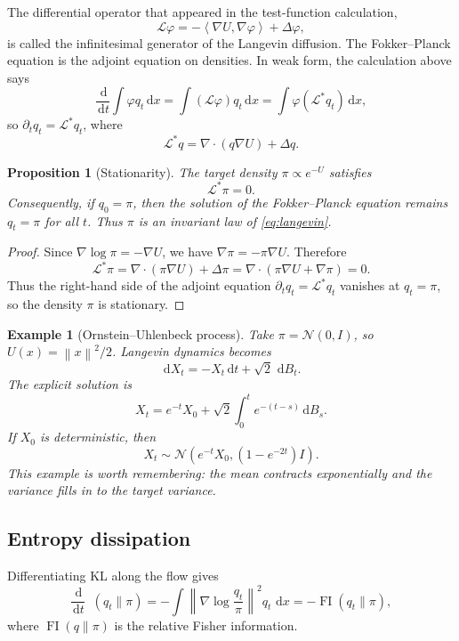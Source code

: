 \documentclass[10pt,a4paper]{amsart}
\numberwithin{equation}{section}
\newtheorem{prop}[theorem]{Proposition}
\newtheorem*{example}{Example}
\DeclareMathOperator{\KL}{D_{\mathsf{KL}}}
\DeclareMathOperator{\FI}{FI}
\newcommand{\dd}{\,\mathrm{d}}
\newcommand{\Id}{I}
\newcommand{\norm}[1]{\left\lVert #1 \right\rVert}
\newcommand{\ip}[2]{\left\langle #1,#2 \right\rangle}
\newcommand{\normal}[2]{\mathcal{N}\!\left(#1,#2\right)}
\begin{document}
The differential operator that appeared in the test-function calculation,
\[
    \mathcal L\varphi
    =
    -\ip{\nabla U}{\nabla\varphi}+\Delta\varphi,
\]
is called the infinitesimal generator of the Langevin diffusion.  The
Fokker--Planck equation is the adjoint equation on densities.  In weak form,
the calculation above says
\[
    \frac{\dd}{\dd t}\int \varphi q_t\dd x
    =
    \int (\mathcal L\varphi) q_t\dd x
    =
    \int \varphi(\mathcal L^\ast q_t)\dd x,
\]
so $\partial_t q_t=\mathcal L^\ast q_t$, where
\[
    \mathcal L^\ast q
    =
    \nabla\cdot(q\nabla U)+\Delta q.
\]

\begin{prop}[Stationarity]
The target density $\pi\propto e^{-U}$ satisfies
\[
    \mathcal L^\ast \pi=0.
\]
Consequently, if $q_0=\pi$, then the solution of the Fokker--Planck equation
remains $q_t=\pi$ for all $t$.  Thus $\pi$ is an invariant law of
\eqref{eq:langevin}.
\end{prop}

\begin{proof}
Since $\nabla\log\pi=-\nabla U$, we have $\nabla\pi=-\pi\nabla U$.  Therefore
\[
    \mathcal L^\ast\pi
    =
    \nabla\cdot(\pi\nabla U)+\Delta\pi
    =
    \nabla\cdot(\pi\nabla U+\nabla\pi)
    =
    0.
\]
Thus the right-hand side of the adjoint equation
$\partial_t q_t=\mathcal L^\ast q_t$ vanishes at $q_t=\pi$, so the density
$\pi$ is stationary.
\end{proof}

\begin{example}[Ornstein--Uhlenbeck process]
Take $\pi=\normal{0}{\Id}$, so $U(x)=\norm{x}^2/2$.  Langevin dynamics becomes
\[
    \dd X_t=-X_t\dd t+\sqrt2\,\dd B_t.
\]
The explicit solution is
\[
    X_t=e^{-t}X_0+\sqrt2\int_0^t e^{-(t-s)}\dd B_s.
\]
If $X_0$ is deterministic, then
\[
    X_t\sim\normal{e^{-t}X_0}{(1-e^{-2t})\Id}.
\]
This example is worth remembering: the mean contracts exponentially and the
variance fills in to the target variance.
\end{example}

\subsection{Entropy dissipation}

Differentiating KL along the flow gives
\begin{equation}\label{eq:entropy-dissipation}
    \frac{\dd}{\dd t}\KL(q_t\|\pi)
    =
    -\int \norm{\nabla\log\frac{q_t}{\pi}}^2 q_t\,\dd x
    =-\FI(q_t\|\pi),
\end{equation}
where $\FI(q\|\pi)$ is the relative Fisher information.
\end{document}
